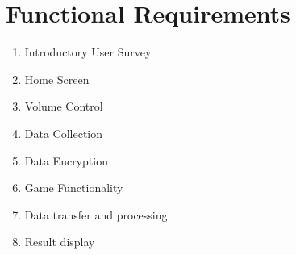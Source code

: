 \documentclass[a4wide]{article}
\begin{document}
%
%
%
%
%
%
%
%
%

\section{Functional Requirements}

\begin{enumerate}
\item Introductory User Survey
\item Home Screen
\item Volume Control
\item Data Collection
\item Data Encryption
\item Game Functionality
\item Data transfer and processing
\item Result display
\end{enumerate}
\end{document}
